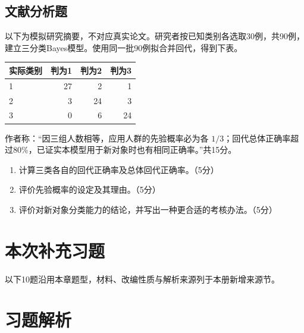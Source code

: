 \par\addvspace{6pt}\noindent\begin{minipage}{\linewidth}

\subsection{文献分析题}


以下为模拟研究摘要，不对应真实论文。研究者按已知类别各选取30例，共90例，建立三分类Bayes模型。使用同一批90例拟合并回代，得到下表。

\begin{center}\small\setlength{\tabcolsep}{4pt}\renewcommand{\arraystretch}{1.18}\begin{tabular}{@{}lrrr@{}}
\toprule
实际类别 & 判为1 & 判为2 & 判为3 \\
\midrule

1 & 27 & 2 & 1 \\
2 & 3 & 24 & 3 \\
3 & 0 & 6 & 24 \\
\bottomrule\end{tabular}\end{center}

作者称：``因三组人数相等，应用人群的先验概率必为各 \(1/3\)；回代总体正确率超过80\%，已证实本模型用于新对象时也有相同正确率。''共15分。

\begin{enumerate}
\def\labelenumi{\arabic{enumi}.}
\tightlist
\item
  计算三类各自的回代正确率及总体回代正确率。（5分）
\item
  评价先验概率的设定及其理由。（5分）
\item
  评价对新对象分类能力的结论，并写出一种更合适的考核办法。（5分）
\end{enumerate}



\end{minipage}\par\vspace{4pt}
\clearpage\section{本次补充习题}
以下10题沿用本章题型，材料、改编性质与解析来源列于本册新增来源节。


\clearpage\section{习题解析}

